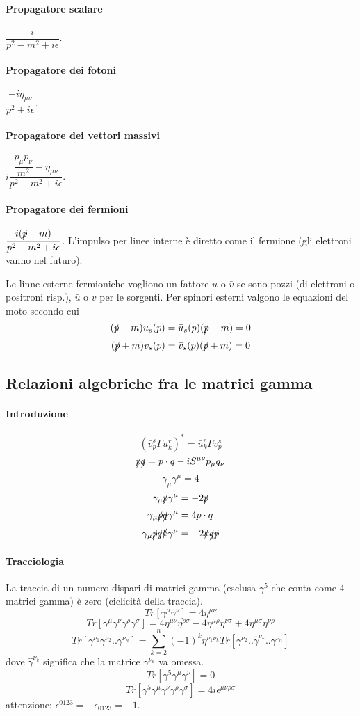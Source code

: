 \documentclass[12pt,a4paper]{article}
\begin{document}
	\paragraph{Propagatore scalare} $\dfrac{i}{p^2-m^2+i\epsilon}$.
	\paragraph{Propagatore dei fotoni} $\dfrac{-i\eta_{\mu\nu}}{p^2+i\epsilon}$.
	\paragraph{Propagatore dei vettori massivi} $i\dfrac{\dfrac{p_\mu p_\nu}{m^2} - \eta_{\mu\nu}}{p^2-m^2+i\epsilon}$.
	\paragraph{Propagatore dei fermioni} $\dfrac{i(\slashed{p} + m)}{p^2-m^2 + i\epsilon}$. L'impulso per linee interne è diretto come il fermione (gli elettroni vanno nel futuro).
	
	Le linne esterne fermioniche vogliono un fattore $u$ o $\bar{v}$ se sono pozzi (di elettroni o positroni risp.), $\bar{u}$ o $v$ per le sorgenti. Per spinori esterni valgono le equazioni del moto secondo cui
	\[ (\slashed{p} - m)u_s(p) = \bar{u}_s(p) (\slashed{p} - m) = 0 \]
	\[ (\slashed{p} + m)v_s(p) = \bar{v}_s(p) (\slashed{p} + m) = 0 \]
	
	\subsection{Relazioni algebriche fra le matrici gamma}
	\paragraph{Introduzione}
	\[ (\bar{v}^s_p \Gamma u^r_k)^* = \bar{u}^r_k \bar{\Gamma} v^s_p \]
	\[ \slashed{p}\slashed{q} = p\cdot q - i S^{\mu\nu} p_\mu q_\nu \]
	\[ \gamma_\mu \gamma^\mu = 4 \]
	\[ \gamma_\mu \slashed{p}\gamma^\mu = -2 \slashed{p} \]
	\[ \gamma_\mu \slashed{p}\slashed{q}\gamma^\mu = 4 p\cdot q \]
	\[ \gamma_\mu\slashed{p}\slashed{q}\slashed{k}\gamma^\mu = -2 \slashed{k}\slashed{q}\slashed{p} \]
	
	\paragraph{Tracciologia}
	La traccia di un numero dispari di matrici gamma (esclusa $\gamma^5$ che conta come 4 matrici gamma) è zero (ciclicità della traccia).
	\[ Tr[\gamma^\mu\gamma^\nu] = 4\eta^{\mu\nu} \]
	\[ Tr[\gamma^\mu\gamma^\nu\gamma^\rho\gamma^\sigma] = 4\eta^{\mu\nu}\eta^{\rho\sigma} -4\eta^{\mu\rho}\eta^{\nu\sigma} + 4\eta^{\mu\sigma}\eta^{\nu\rho} \]
	\[ Tr[\gamma^{\nu_1}\gamma^{\nu_2}..\gamma^{\nu_n}] = \sum_{k=2}^{n} (-1)^k \eta^{\nu_1\nu_k} Tr[\gamma^{\nu_2}..\hat{\gamma}^{\nu_k}..\gamma^{\nu_n}] \]
	dove $\hat{\gamma}^{\nu_k}$ significa che la matrice $\gamma^{\nu_k}$ va omessa.
	\[ Tr[\gamma^5\gamma^\mu\gamma^\nu] = 0 \]
	\[ Tr[\gamma^5\gamma^\mu\gamma^\nu\gamma^\rho\gamma^\sigma] = 4i\epsilon^{\mu\nu\rho\sigma} \]
	attenzione: $\epsilon^{0123} = -\epsilon_{0123} = -1$.
	
\end{document}
